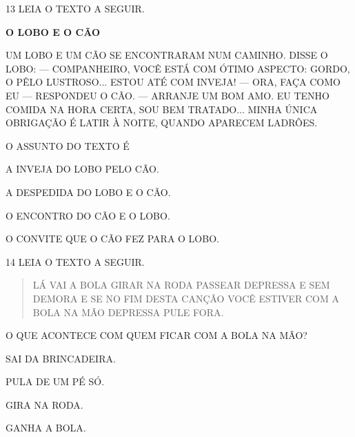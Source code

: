 \num{13} LEIA O TEXTO A SEGUIR.

\begin{myquote}
\textbf{O LOBO E O CÃO}

UM LOBO E UM CÃO SE ENCONTRARAM NUM CAMINHO. DISSE O LOBO: — COMPANHEIRO, VOCÊ ESTÁ COM ÓTIMO ASPECTO: GORDO, O PÊLO LUSTROSO... ESTOU ATÉ COM INVEJA! — ORA, FAÇA COMO EU — RESPONDEU O CÃO. — ARRANJE UM BOM AMO. EU TENHO COMIDA NA HORA CERTA, SOU BEM TRATADO... MINHA ÚNICA OBRIGAÇÃO É LATIR À NOITE, QUANDO APARECEM LADRÕES. 

\end{myquote}

O ASSUNTO DO TEXTO É

\begin{escolha}

\item A INVEJA DO LOBO PELO CÃO.

\item A DESPEDIDA DO LOBO E O CÃO.

\item O ENCONTRO DO CÃO E O LOBO.

\item O CONVITE QUE O CÃO FEZ PARA O LOBO.

\end{escolha}

\num{14} LEIA O TEXTO A SEGUIR.

\begin{myquote}
\begin{verse}
LÁ VAI A BOLA
GIRAR NA RODA
PASSEAR DEPRESSA
E SEM DEMORA
E SE NO FIM
DESTA CANÇÃO
VOCÊ ESTIVER
COM A BOLA NA MÃO
DEPRESSA PULE FORA.
\end{verse}

\end{myquote}

O QUE ACONTECE COM QUEM FICAR COM A BOLA NA MÃO?

\begin{escolha}

\item SAI DA BRINCADEIRA.
\item PULA DE UM PÉ SÓ.
\item GIRA NA RODA.
\item GANHA A BOLA.

\end{escolha}

